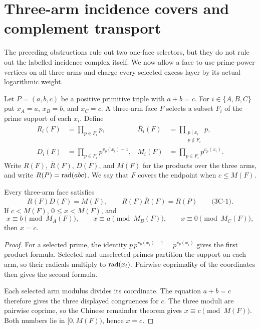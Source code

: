 \section{Three-arm incidence covers and complement transport}
\label{sec:three-arm-incidence-successor}

The preceding obstructions rule out two one-face selectors, but they do not
rule out the labelled incidence complex itself.  We now allow a face to use
prime-power vertices on all three arms and charge every selected excess layer
by its actual logarithmic weight.

Let $P=(a,b,c)$ be a positive primitive triple with $a+b=c$.  For
$i\in\{A,B,C\}$ put $x_A=a$, $x_B=b$, and $x_C=c$.  A three-arm face $F$
selects a subset $F_i$ of the prime support of each $x_i$.  Define
\[
 \begin{aligned}
 R_i(F)&=\prod_{p\in F_i}p,
 &\overline R_i(F)&=\prod_{\substack{p\mid x_i\\p\notin F_i}}p,\\
 D_i(F)&=\prod_{p\in F_i}p^{v_p(x_i)-1},
 &M_i(F)&=\prod_{p\in F_i}p^{v_p(x_i)}.
 \end{aligned}
\]
Write $R(F)$, $\overline R(F)$, $D(F)$, and $M(F)$ for the products over
the three arms, and write $R(P)=\operatorname{rad}(abc)$.  We say that $F$ covers the
endpoint when $c\le M(F)$.

\begin{proposition}
\label{prop:three-arm-products-crt}
Every three-arm face satisfies
\[
 R(F)D(F)=M(F),\qquad R(F)\overline R(F)=R(P)
 \qquad\text{(3C-1)}.
\]
If $c<M(F)$, $0\le x<M(F)$, and
\[
 x\equiv b\pmod {M_A(F)},\qquad
 x\equiv a\pmod {M_B(F)},\qquad
 x\equiv0\pmod {M_C(F)},
\]
then $x=c$.
\end{proposition}

\begin{proof}
For a selected prime, the identity
$p\,p^{v_p(x_i)-1}=p^{v_p(x_i)}$ gives the first product formula.
Selected and unselected primes partition the support on each arm, so their
radicals multiply to $\operatorname{rad}(x_i)$.  Pairwise coprimality of the coordinates
then gives the second formula.

Each selected arm modulus divides its coordinate.  The equation $a+b=c$
therefore gives the three displayed congruences for $c$.  The three moduli
are pairwise coprime, so the Chinese remainder theorem gives
$x\equiv c\pmod {M(F)}$.  Both numbers lie in $[0,M(F))$, hence $x=c$.
\end{proof}

